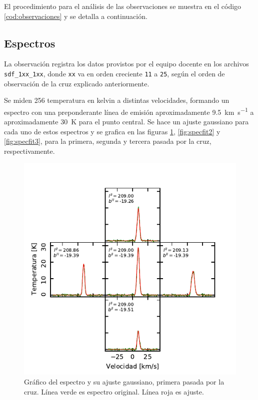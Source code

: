 El procedimiento para el análisis de las observaciones se muestra en el código \ref{cod:observaciones} y se detalla a continuación.

\subsection{Espectros}

La observación registra los datos provistos por el equipo docente en los archivos \texttt{sdf\_1xx\_1xx}, donde \texttt{xx} va en orden creciente \texttt{11} a \texttt{25}, según el orden de observación de la cruz explicado anteriormente. 

Se miden 256 temperatura en kelvin a distintas velocidades, formando un espectro con una preponderante línea de emisión aproximadamente \SI{9.5}{\kilo\meter\per\second} a aproximadamente \SI{30}{\kelvin} para el punto central. Se hace un ajuste gaussiano para cada uno de estos espectros y se grafica en las figuras \ref{fig:specfit1}, \ref{fig:specfit2} y \ref{fig:specfit3}, para la primera, segunda y tercera pasada por la cruz, respectivamente.

\begin{figure}[p]
	\centering
	\includegraphics{specfit1.pdf}
	\caption{Gráfico del espectro y su ajuste gaussiano, primera pasada por la cruz. Línea verde es espectro original. Línea roja es ajuste.}
	\label{fig:specfit1}
\end{figure}

